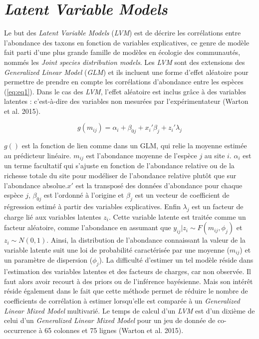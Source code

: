 \documentclass[
  12pt,
  a4paper,
  oneside]{report}
\begin{document}
\hypertarget{latent-variable-models}{%
\section{\texorpdfstring{\emph{Latent Variable
Models}}{Latent Variable Models}}\label{latent-variable-models}}

Le but des \emph{Latent Variable Models} (\emph{LVM}) est de décrire les
corrélations entre l'abondance des taxons en fonction de variables
explicatives, ce genre de modèle fait parti d'une plus grande famille de
modèles en écologie des communautés, nommés les \emph{Joint species
distribution models}. Les \emph{LVM} sont des extensions des
\emph{Generalized Linear Model} (\emph{GLM}) et ils incluent une forme
d'effet aléatoire pour permettre de prendre en compte les corrélations
d'abondance entre les espèces (\cref{eq:eq1}). Dans le cas des
\emph{LVM}, l'effet aléatoire est inclus grâce à des variables latentes
: c'est-à-dire des variables non mesurées par l'expérimentateur (Warton
et al. 2015).

\begin{equation}g(m_{ij}) = \alpha_i + \beta_{0j} + x_i'\beta_j + z_i'\lambda_j\label{eq:eq1}\end{equation}

\(g()\) est la fonction de lien comme dans un GLM, qui relie la moyenne
estimée au prédicteur linéaire. \(m_{ij}\) est l'abondance moyenne de
l'espèce \(j\) au site \(i\). \(\alpha_{i}\) est un terme facultatif qui
s'ajuste en fonction de l'abondance relative ou de la richesse totale du
site pour modéliser de l'abondance relative plutôt que sur l'abondance
absolue.\(x'\) est la transposé des données d'abondance pour chaque
espèce \(j\), \(\beta_{0j}\) est l'ordonné à l'origine et \(\beta_j\)
est un vecteur de coefficient de régression estimé à partir des
variables explicatives. Enfin \(\lambda_j\) est un facteur de charge lié
aux variables latentes \(z_i\). Cette variable latente est traitée comme
un facteur aléatoire, comme l'abondance en assumant que
\(y_{ij}|z_i \sim F(m_{ij}, \phi_j)\) et \(z_i \sim N(0,1)\). Ainsi, la
distribution de l'abondance connaissant la valeur de la variable latente
suit une loi de probabilité caractérisée par une moyenne (\(m_{ij}\)) et
un paramètre de dispersion (\(\phi_j\)). La difficulté d'estimer un tel
modèle réside dans l'estimation des variables latentes et des facteurs
de charges, car non observée. Il faut alors avoir recourt à des priors
ou de l'inférence bayésienne. Mais son intérêt réside également dans le
fait que cette méthode permet de réduire le nombre de coefficients de
corrélation à estimer lorsqu'elle est comparée à un \emph{Generalized
Linear Mixed Model} multivarié. Le temps de calcul d'un \emph{LVM} est
d'un dixième de celui d'un \emph{Generalized Linear Mixed Model} pour un
jeu de donnée de co-occurrence à 65 colonnes et 75 lignes (Warton et al.
2015).
\end{document}
